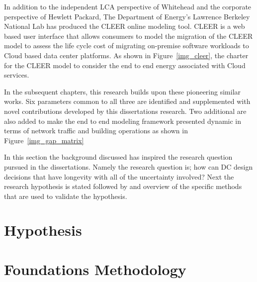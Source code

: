     In addition to the independent LCA perspective of Whitehead and the corporate perspective of Hewlett Packard, The Department of Energy's Lawrence Berkeley National Lab  has produced the CLEER online modeling tool\cite{CLEER13}. CLEER is a web based user interface that allows consumers to model the migration of the CLEER model to assess the life cycle cost of migrating on-premise software workloads to Cloud based data center platforms. As shown in Figure~\ref{img_cleer}, the charter for the CLEER model to consider the end to end energy associated with Cloud services.
    
    
    
    In the subsequent chapters, this research builds upon these pioneering similar works. Six parameters common to all three are identified and supplemented with novel contributions developed by this dissertations research. Two additional are also added to make the end to end modeling framework presented dynamic in terms of network traffic and building operations as shown in Figure~\ref{img_gap_matrix}
    
    
    
    In this section the background discussed has inspired the research question pursued in the dissertations. Namely the research question is; how can DC design decisions that have longevity  with all of the uncertainty involved? Next the research hypothesis is stated followed by and overview of the specific methods that are used to validate the hypothesis.
    
\section{Hypothesis}

\section{Foundations Methodology}
    

    
    

